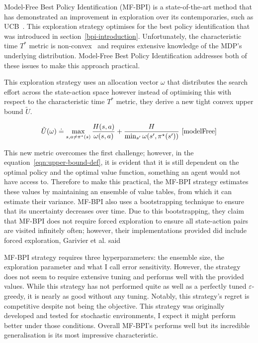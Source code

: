 \documentclass[]{final_report}
\begin{document}
Model-Free Best Policy Identification (MF-BPI) is a state-of-the-art method that has demonstrated an improvement in exploration over its contemporaries, such as UCB~\cite{modelFree}. This exploration strategy optimises for the best policy identification that was introduced in section~\ref{bpi-introduction}. Unfortunately, the characteristic time $T^*$ metric is non-convex~\cite{characteristicTimeNonConvex} and requires extensive knowledge of the MDP's underlying distribution. Model-Free Best Policy Identification addresses both of these issues to make this approach practical.

This exploration strategy uses an allocation vector $\omega$ that distributes the search effort across the state-action space however instead of optimising this with respect to the characteristic time $T^*$ metric, they derive a new tight convex upper bound $\tilde{U}$. 

\begin{equation}
  \tilde{U}(\omega) \doteq \max_{s,a \neq \pi^\star(s)} \frac{H(s,a)}{\omega(s,a)} + \frac{H}{\min_{s'} \omega(s',\pi^\star(s'))}~\cite{modelFree} \label{eqn:upper-bound-def}
\end{equation}


This new metric overcomes the first challenge; however, in the equation~\ref{eqn:upper-bound-def}, it is evident that it is still dependent on the optimal policy and the optimal value function, something an agent would not have access to. Therefore to make this practical, the MF-BPI strategy estimates these values by maintaining an ensemble of value tables, from which it can estimate their variance. MF-BPI also uses a bootstrapping technique to ensure that its uncertainty decreases over time. Due to this bootstrapping, they claim that MF-BPI does not require forced exploration to ensure all state-action pairs are visited infinitely often; however, their implementations provided did include forced exploration, Garivier et al. said ~\cite{characteristicTime}

MF-BPI strategy requires three hyperparameters: the ensemble size, the exploration parameter and what I call error sensitivity. However, the strategy does not seem to require extensive tuning and performs well with the provided values. While this strategy has not performed quite as well as a perfectly tuned $\varepsilon$-greedy, it is nearly as good without any tuning. Notably, this strategy's regret is competitive despite not being the objective. This strategy was originally developed and tested for stochastic environments, I expect it might perform better under those conditions. Overall MF-BPI's performs well but its incredible generalisation is its most impressive characteristic. 
\end{document}
